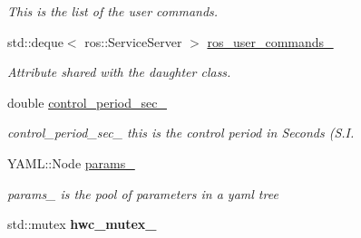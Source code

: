 \begin{DoxyCompactItemize}
\begin{DoxyCompactList}\small\item\em This is the list of the user commands. \end{DoxyCompactList}\item 
std\+::deque$<$ ros\+::\+Service\+Server $>$ \hyperlink{classdynamic__graph_1_1DynamicGraphManager_a0fb35bc44f331db3570c09b75b49cd15}{ros\+\_\+user\+\_\+commands\+\_\+}
\begin{DoxyCompactList}\small\item\em Attribute shared with the daughter class. \end{DoxyCompactList}\item 
double \hyperlink{classdynamic__graph_1_1DynamicGraphManager_a2c0f1323534e9e1b17f3b1cc23f0c7f1}{control\+\_\+period\+\_\+sec\+\_\+}
\begin{DoxyCompactList}\small\item\em control\+\_\+period\+\_\+sec\+\_\+ this is the control period in Seconds (S.\+I. \end{DoxyCompactList}\item 
Y\+A\+M\+L\+::\+Node \hyperlink{classdynamic__graph_1_1DynamicGraphManager_ad3773835c294117a500af96d272921ea}{params\+\_\+}\hypertarget{classdynamic__graph_1_1DynamicGraphManager_ad3773835c294117a500af96d272921ea}{}\label{classdynamic__graph_1_1DynamicGraphManager_ad3773835c294117a500af96d272921ea}

\begin{DoxyCompactList}\small\item\em params\+\_\+ is the pool of parameters in a yaml tree \end{DoxyCompactList}\item 
std\+::mutex {\bfseries hwc\+\_\+mutex\+\_\+}\hypertarget{classdynamic__graph_1_1DynamicGraphManager_a1b7d9df75790d22b3258e1bd42fd537d}{}\label{classdynamic__graph_1_1DynamicGraphManager_a1b7d9df75790d22b3258e1bd42fd537d}

\end{DoxyCompactItemize}
